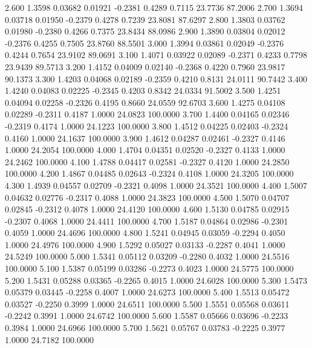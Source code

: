    2.600   1.3598   0.03682   0.01921  -0.2381   0.4289   0.7115  23.7736  87.2006
   2.700   1.3694   0.03718   0.01950  -0.2379   0.4278   0.7239  23.8081  87.6297
   2.800   1.3803   0.03762   0.01980  -0.2380   0.4266   0.7375  23.8434  88.0986
   2.900   1.3890   0.03804   0.02012  -0.2376   0.4255   0.7505  23.8760  88.5501
   3.000   1.3994   0.03861   0.02049  -0.2376   0.4244   0.7654  23.9102  89.0691
   3.100   1.4071   0.03922   0.02089  -0.2371   0.4233   0.7798  23.9439  89.5713
   3.200   1.4152   0.04009   0.02140  -0.2368   0.4220   0.7960  23.9817  90.1373
   3.300   1.4203   0.04068   0.02189  -0.2359   0.4210   0.8131  24.0111  90.7442
   3.400   1.4240   0.04083   0.02225  -0.2345   0.4203   0.8342  24.0334  91.5002
   3.500   1.4251   0.04094   0.02258  -0.2326   0.4195   0.8660  24.0559  92.6703
   3.600   1.4275   0.04108   0.02289  -0.2311   0.4187   1.0000  24.0823 100.0000
   3.700   1.4400   0.04165   0.02346  -0.2319   0.4174   1.0000  24.1223 100.0000
   3.800   1.4512   0.04225   0.02403  -0.2324   0.4160   1.0000  24.1637 100.0000
   3.900   1.4612   0.04287   0.02461  -0.2327   0.4146   1.0000  24.2054 100.0000
   4.000   1.4704   0.04351   0.02520  -0.2327   0.4133   1.0000  24.2462 100.0000
   4.100   1.4788   0.04417   0.02581  -0.2327   0.4120   1.0000  24.2850 100.0000
   4.200   1.4867   0.04485   0.02643  -0.2324   0.4108   1.0000  24.3205 100.0000
   4.300   1.4939   0.04557   0.02709  -0.2321   0.4098   1.0000  24.3521 100.0000
   4.400   1.5007   0.04632   0.02776  -0.2317   0.4088   1.0000  24.3823 100.0000
   4.500   1.5070   0.04707   0.02845  -0.2312   0.4078   1.0000  24.4120 100.0000
   4.600   1.5130   0.04785   0.02915  -0.2307   0.4068   1.0000  24.4411 100.0000
   4.700   1.5187   0.04864   0.02986  -0.2301   0.4059   1.0000  24.4696 100.0000
   4.800   1.5241   0.04945   0.03059  -0.2294   0.4050   1.0000  24.4976 100.0000
   4.900   1.5292   0.05027   0.03133  -0.2287   0.4041   1.0000  24.5249 100.0000
   5.000   1.5341   0.05112   0.03209  -0.2280   0.4032   1.0000  24.5516 100.0000
   5.100   1.5387   0.05199   0.03286  -0.2273   0.4023   1.0000  24.5775 100.0000
   5.200   1.5431   0.05288   0.03365  -0.2265   0.4015   1.0000  24.6028 100.0000
   5.300   1.5473   0.05379   0.03445  -0.2258   0.4007   1.0000  24.6273 100.0000
   5.400   1.5513   0.05472   0.03527  -0.2250   0.3999   1.0000  24.6511 100.0000
   5.500   1.5551   0.05568   0.03611  -0.2242   0.3991   1.0000  24.6742 100.0000
   5.600   1.5587   0.05666   0.03696  -0.2233   0.3984   1.0000  24.6966 100.0000
   5.700   1.5621   0.05767   0.03783  -0.2225   0.3977   1.0000  24.7182 100.0000
